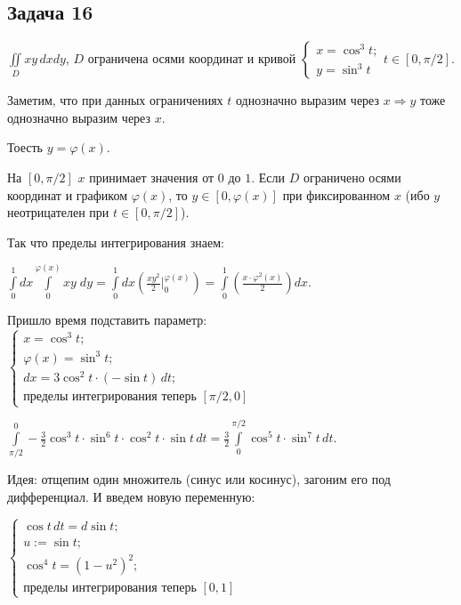 \documentclass[a4paper, fleqn]{article}
\begin{document}
    
    \subsection*{Задача 16}
    
    $\iint\limits_D xy \, dxdy$, $D$ ограничена осями координат и кривой $\begin{cases} 
    x = \cos^3 t;\\
    y = \sin^3 t
    \end{cases} t \in [0, \pi / 2].$
    
    Заметим, что при данных ограничениях $t$ однозначно выразим через $x \Rightarrow y$  тоже однозначно выразим через $x$.
    
    Тоесть $y = \varphi(x)$.
    
    На $[0, \pi/2]$ $x$ принимает значения от $0$ до $1$. Если $D$ ограничено осями координат и графиком $\varphi(x)$, то $y \in [0, \varphi(x)]$ при фиксированном $x$  (ибо $y$ неотрицателен при $t \in [0, \pi/2]$).
     
     Так что пределы интегрирования знаем:
     
     $\int\limits_{0}^{1} dx \int\limits_{0}^{\varphi(x)} xy \; dy = \int\limits_{0}^{1} dx \left( \frac{xy^2}{2}  \Bigg|_{0}^{\varphi(x)}
     \right)  = \int\limits_{0}^{1}  \left( \frac{x \cdot \varphi^2(x)}{2}\right) dx.$
     
     Пришло время подставить параметр: $\begin{cases} x = \cos^3 t;\\
     \varphi(x) = \sin^3 t;\\
     dx = 3 \cos^2 t \cdot (-\sin t) \, dt;\\
     \text{пределы интегрирования теперь } [\pi/2, 0]
     \end{cases}$
     
     $\int\limits_{\pi/2}^{0} -\frac{3}{2} \cos^3 t \cdot \sin^6 t \cdot \cos^2 t \cdot \sin t \, dt = \frac{3}{2} \int\limits_{0}^{\pi/ 2} \cos^5 t\cdot \sin^7 t \, dt.$
     
     Идея: отщепим один множитель (синус или косинус), загоним его под дифференциал. И введем новую переменную:
     
     $\begin{cases}
     \cos t \,dt = d \sin t;\\
     u := \sin t;\\
     \cos ^ 4 t = (1 - u^2)^2;\\
     \text{пределы интегрирования теперь } [0, 1]
     \end{cases}$
    
\end{document}
